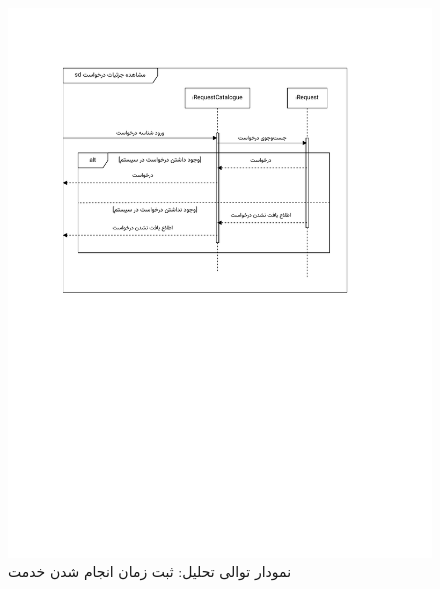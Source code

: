 \begin{figure}[ht!]
	\centering
	\includegraphics[scale=0.8, page=9]{figs/OOD-Sequence-2.pdf}
	\caption{نمودار توالی تحلیل: ثبت زمان انجام شدن خدمت}
\end{figure}
\FloatBarrier
\newpage

